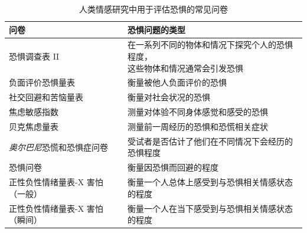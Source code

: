 \begin{table}[htbp]
	\caption{人类情感研究中用于评估恐惧的常见问卷} \label{tab:42_1} \centering
	\begin{tabular}{ll}
		\toprule
		问卷 & 恐惧问题的类型 \\
		\midrule
		恐惧调查表 II & \makecell[l]{在一系列不同的物体和情况下探究个人的恐惧程度，\\这些物体和情况通常会引发恐惧} \\
		负面评价恐惧量表 & 衡量被他人负面评价的恐惧 \\
		社交回避和苦恼量表 & 衡量对社会状况的恐惧 \\
		焦虑敏感指数 & 测量对体验不同身体感觉和感受的恐惧 \\
		贝克焦虑量表 & 测量前一周经历的恐惧和恐慌相关症状 \\
		\textit{奥尔巴尼}恐慌和恐惧症问卷 & 受试者是否估计了他们在不同情况下会经历的恐惧程度 \\
		恐惧问卷 & 衡量因恐惧而回避的程度 \\
		正性负性情绪量表-X 害怕（一般） & 衡量一个人总体上感受到与恐惧相关情感状态的程度 \\
		正性负性情绪量表-X 害怕（瞬间） & 衡量一个人在当下感受到与恐惧相关情感状态的程度 \\
		\bottomrule
	\end{tabular}
\end{table}


